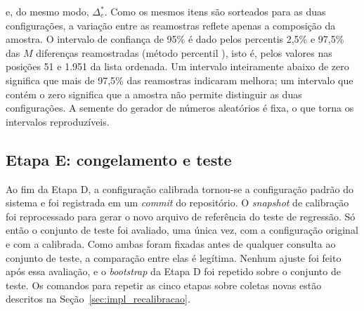 \noindent e, do mesmo modo, $\Delta_e^{*}$. Como os mesmos itens são
sorteados para as duas configurações, a variação entre as reamostras reflete
apenas a composição da amostra. O intervalo de confiança de 95\% é dado pelos
percentis 2,5\% e 97,5\% das $M$ diferenças reamostradas (método percentil
\cite{efron1993}), isto é, pelos valores nas posições 51 e 1.951 da lista
ordenada. Um intervalo inteiramente abaixo de zero significa que mais de
97,5\% das reamostras indicaram melhora; um intervalo que contém o zero
significa que a amostra não permite distinguir as duas configurações. A
semente do gerador de números aleatórios é fixa, o que torna os intervalos
reproduzíveis.

\subsection{Etapa E: congelamento e teste}
\label{subsec:etapaE}

Ao fim da Etapa D, a configuração calibrada tornou-se a configuração padrão do
sistema e foi registrada em um \textit{commit} do repositório. O
\textit{snapshot} de calibração foi reprocessado para gerar o novo arquivo de
referência do teste de regressão. Só então o conjunto de teste foi avaliado,
uma única vez, com a configuração original e com a calibrada. Como ambas foram
fixadas antes de qualquer consulta ao conjunto de teste, a comparação entre
elas é legítima. Nenhum ajuste foi feito após essa avaliação, e o
\textit{bootstrap} da Etapa D foi repetido sobre o conjunto de teste. Os
comandos para repetir as cinco etapas sobre coletas novas estão descritos na
Seção~\ref{sec:impl_recalibracao}.
